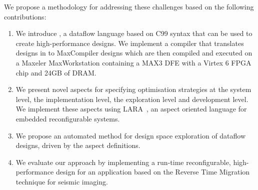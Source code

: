We propose a methodology for addressing these challenges based on the
following contributions:
\begin{enumerate}
\item We introduce \MAXC{}, a dataflow language based on C99 syntax
  that can be used to create high-performance designs. We implement a
  compiler that translates designs in \MAXC{} to MaxCompiler
  \cite{5719584} designs which are then compiled and executed on a
  Maxeler MaxWorkstation containing a MAX3 DFE with a Virtex 6 FPGA
  chip and 24GB of DRAM.
\item We present novel aspects for specifying optimisation
  strategies at the system level, the implementation level, the
  exploration level and development level. We implement these aspects
  using
  LARA~\cite{Cardoso:Carvalho:Cutinho:Luk:Nobre:Diniz:Petrov:2012}, an
  aspect oriented language for embedded reconfigurable systems.
\item We propose an automated method for design space exploration of
  \MAXC{} dataflow designs, driven by the aspect definitions.
\item We evaluate our approach by implementing a run-time
  reconfigurable, high-performance design for an application based on
  the Reverse Time Migration technique for seismic imaging.
\end{enumerate}
